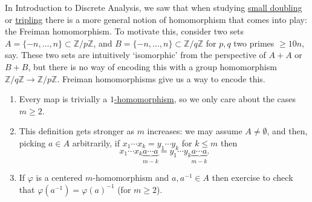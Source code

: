 \documentclass{article}
\numberwithin{equation}{section}
\begin{document}
In Introduction to Discrete Analysis, we saw that when studying \hyperlink{def:doubling}{small doubling} or \hyperlink{def:tripling}{tripling} there is a more general notion of homomorphism that comes into play: the Freiman homomorphism. To motivate this, consider two sets $A = \{-n, \dotsc, n\} \subset \mathbb{Z}/p\mathbb{Z}$, and $B = \{-n, \dotsc, n\} \subset \mathbb{Z}/q\mathbb{Z}$ for $p,q$ two primes $\geq 10n$, say.
These two sets are intuitively `isomorphic' from the perspective of $A + A$ or $B+B$, but there is no way of encoding this with a group homomorphism $\mathbb{Z}/q\mathbb{Z} \to \mathbb{Z}/p\mathbb{Z}$.
Freiman homomorphisms give us a way to encode this.
\begin{remark}\leavevmode
  \begin{enumerate}[label=(\arabic*)]
    \item Every map is trivially a \hyperlink{def:fhom}{$1$-homomorphism}, so we only care about the cases $m \geq 2$.
    \item This definition gets stronger as $m$ increases: we may assume $A \neq \emptyset$, and then, picking $a \in A$ arbitrarily, if $x_1 \dotsm x_k = y_1 \dotsm y_k$ for $k \leq m$ then
      \begin{equation*}
        x_1 \dotsm x_k \underbrace{a \dotsm a}_{m-k} =
        y_1 \dotsm y_k \underbrace{a \dotsm a}_{m-k}.
      \end{equation*}
    \item If $\varphi$ is a centered $m$-homomorphism and $a, a^{-1} \in A$ then exercise to check that $\varphi(a^{-1}) = \varphi(a)^{-1}$ (for $m \geq 2$).
  \end{enumerate}
\end{remark}
\end{document}
